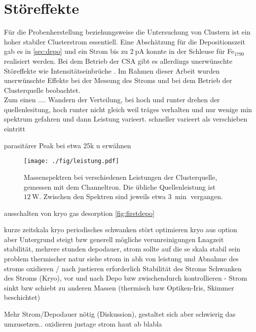 \section{Störeffekte}
Für die Probenherstellung beziehungsweise die Untersuchung von Clustern ist ein hoher stabiler Clusterstrom essentiell.
Eine Abschätzung für die Depositionszeit gab es in \ref{sec:depo} und ein Strom bis zu $\SI{2}{\pA}$ konnte in der Schleuse für Fe$_{1790}$ realisiert werden.
Bei dem Betrieb der CSA gibt es allerdings unerwünschte Störeffekte wie Intensitätseinbrüche \cite[S. 45]{gust}.
Im Rahmen dieser Arbeit wurden unerwünschte Effekte bei der Messung des Stroms und bei dem Betrieb der Clusterquelle beobachtet.\\

Zum einen ....
Wandern der Verteilung, bei hoch und runter drehen der quellenlesitung, hoch runter nicht gleich weil träges verhalten und nur wenige min spektrum gefahren und dann Leistung varieert. schneller varieert als verschieben eintritt

parasitärer Peak bei etwa 25k u erwähnen \cite{gust}

\begin{figure}
  \centering
  \texttt{[image: ./fig/leistung.pdf]}
  \caption{Massenspektren bei verschiedenen Leistungen der Clusterquelle, gemessen mit dem Channeltron. Die übliche Quellenleistung ist $\SI{12}{\watt}$. Zwischen den Spektren sind jeweils etwa $\SI{3}{\min}$ vergangen.}
  \label{fig:leistung}
\end{figure}
ausschalten von kryo gas desorption \ref{fig:firstdepo}


kurze zeitskala kryo periodisches schwanken stört optimieren
kryo aus option aber Untergrund steigt bzw generell mögliche verunreinigungen
Lnagzeit stabilität, mehrere stunden depodauer, strom sollte auf die se skala stabil sein
problem thermischer natur siehe strom in abh von leistung
und Abnahme des stroms oxidieren / nach justieren erforderlich
Stabilität des Stroms
Schwanken des Stroms (Kryo), vor und nach Depo bzw zwischendurch kontrollieren - 
Strom sinkt bzw schiebt zu anderen Massen (thermisch bzw Optiken-Iris, Skimmer beschichtet)

Mehr Strom/Depodauer nötig (Diskussion), gestaltet sich aber schwierig das umzusetzen.. 
oxidieren justage strom haut ab blabla

